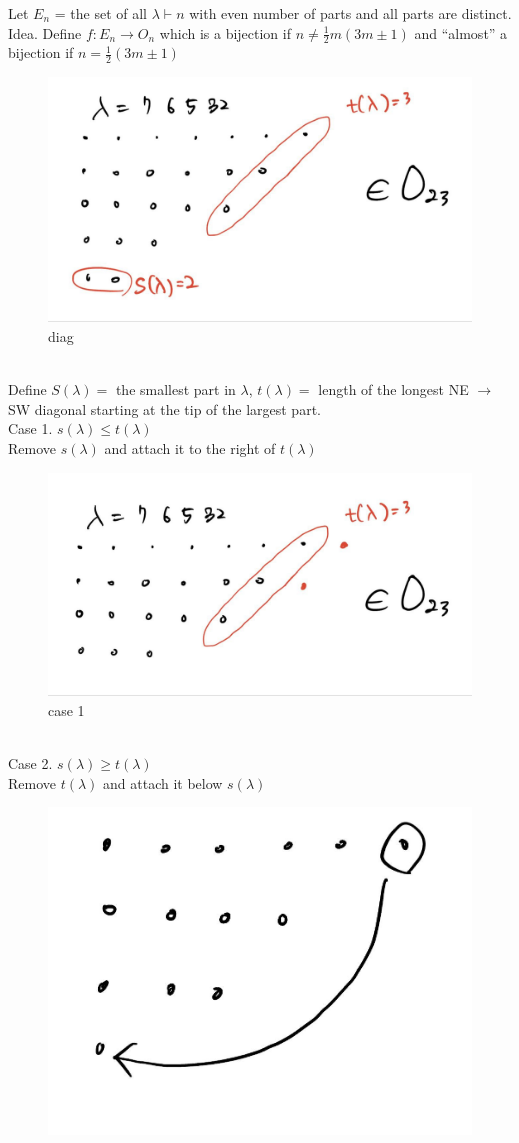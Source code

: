 \documentclass{article}
\theoremstyle{definition}
\newenvironment{pf*}{\pushQED{\qed}\pf}{\popQED\endpf}
\begin{document}
\begin{pf*}
    Let $E_n$ = the set of all $\lambda \vdash n $ with even number of parts
    and all parts are distinct. \\ 
    Idea. Define $f: E_n \rightarrow O_n$ which is a bijection if $n \ne 
    \frac{1}{2}m(3m\pm 1)$ and ``almost'' a bijection if $n=\frac{1}{2}(3m\pm 1)$ \\
    \begin{figure}[!h]
        \centerline{\includegraphics[width=0.5\columnwidth]{S_T_diag.jpg}}
        \caption{diag}
        \label{diag} 
    \end{figure}
    \\
    Define $S(\lambda) =$ the smallest part in $\lambda$, $t(\lambda) = $
    length of the longest NE $\rightarrow$ SW diagonal starting at the tip 
    of the largest part. \\ 
    Case 1. $s(\lambda) \le t(\lambda)$ \\ 
    Remove $s(\lambda)$ and attach it to the right of $t(\lambda)$\\ 
    \begin{figure}[!h]
        \centerline{\includegraphics[width=0.5\columnwidth]{stdiag2.jpg}}
        \caption{case 1}
        \label{diag1} 
    \end{figure}
    \\ 
    Case 2. $s(\lambda) \ge t(\lambda)$ \\ 
    Remove $t(\lambda)$ and attach it below $s(\lambda)$\\
    \begin{figure}[!h]
        \centerline{\includegraphics[width=0.5\columnwidth]{stdiag3.jpg}}

\end{figure}
\end{pf*}
\end{document}

